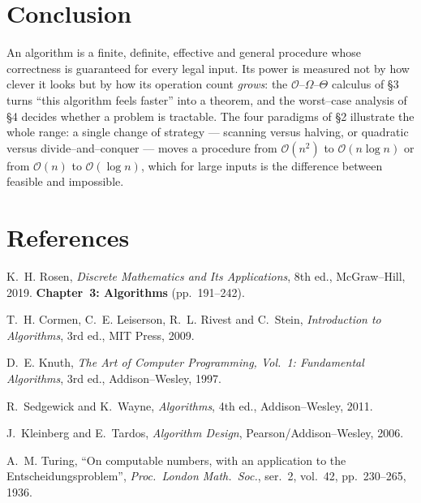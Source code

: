 \documentclass[11pt,a4paper]{article}
\theoremstyle{definition}
\theoremstyle{plain}
\newcommand{\bigO}{\mathcal{O}}
\newcommand{\bigOmega}{\Omega}
\newcommand{\bigTheta}{\Theta}
\begin{document}
\section{Conclusion}

An algorithm is a finite, definite, effective and general procedure whose
correctness is guaranteed for every legal input. Its power is measured not by
how clever it looks but by how its operation count \emph{grows}: the
$\bigO$--$\bigOmega$--$\bigTheta$ calculus of \S3 turns ``this algorithm feels
faster'' into a theorem, and the worst--case analysis of \S4 decides whether a
problem is tractable. The four paradigms of \S2 illustrate the whole range: a
single change of strategy --- scanning versus halving, or quadratic versus
divide--and--conquer --- moves a procedure from $\bigO(n^2)$ to
$\bigO(n\log n)$ or from $\bigO(n)$ to $\bigO(\log n)$, which for large inputs is
the difference between feasible and impossible.

\section*{References}
\begin{enumerate}[label={[\arabic*]},leftmargin=2.2em]
\item K.~H. Rosen, \emph{Discrete Mathematics and Its Applications},
      8th ed., McGraw--Hill, 2019. \textbf{Chapter~3: Algorithms} (pp.~191--242).
\item T.~H. Cormen, C.~E. Leiserson, R.~L. Rivest and C.~Stein,
      \emph{Introduction to Algorithms}, 3rd ed., MIT Press, 2009.
\item D.~E. Knuth, \emph{The Art of Computer Programming, Vol.~1:
      Fundamental Algorithms}, 3rd ed., Addison--Wesley, 1997.
\item R.~Sedgewick and K.~Wayne, \emph{Algorithms}, 4th ed., Addison--Wesley, 2011.
\item J.~Kleinberg and E.~Tardos, \emph{Algorithm Design},
      Pearson/Addison--Wesley, 2006.
\item A.~M. Turing, ``On computable numbers, with an application to the
      Entscheidungsproblem'', \emph{Proc.\ London Math.\ Soc.}, ser.~2,
      vol.~42, pp.~230--265, 1936.
\end{enumerate}
\end{document}
